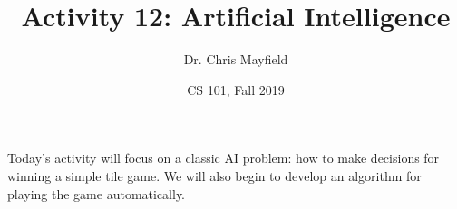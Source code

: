 \documentclass[12pt]{article}
\title{Activity 12: Artificial Intelligence}
\author{Dr. Chris Mayfield}
\date{CS 101, Fall 2019}
\begin{document}
\maketitle

Today's activity will focus on a classic AI problem: how to make decisions for winning a simple tile game.
We will also begin to develop an algorithm for playing the game automatically.



\end{document}
